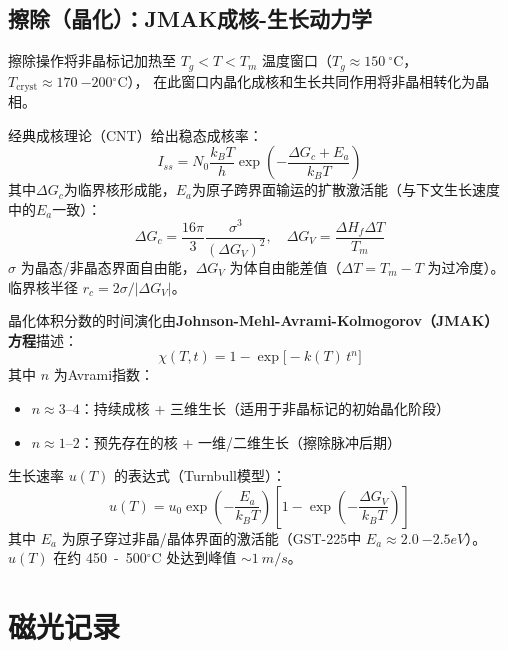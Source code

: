 \documentclass[11pt,a4paper,twoside]{article}
\newcommand{\degC}{\ensuremath{{}^{\circ}\mathrm{C}}}
\theoremstyle{definition}\newtheorem{definition}{定义}[section]
\theoremstyle{plain}\newtheorem{theorem}{定理}[section]
\theoremstyle{remark}\newtheorem{remark}{注解}[section]
\begin{document}
\subsection{擦除（晶化）：JMAK成核-生长动力学}

擦除操作将非晶标记加热至 $T_g < T < T_m$ 温度窗口（$T_g \approx \SI{150}{\degC{}}$，
$T_{\text{cryst}} \approx \SI{170}{-200}{\degC{}}$），
在此窗口内晶化成核和生长共同作用将非晶相转化为晶相。

经典成核理论（CNT）给出稳态成核率：
\begin{equation}\label{eq:nucleation}
  I_{ss} = N_0 \frac{k_B T}{h}
          \exp\!\left( -\frac{\Delta G_c + E_a}{k_B T} \right)
\end{equation}
其中$\Delta G_c$为临界核形成能，$E_a$为原子跨界面输运的扩散激活能（与下文生长速度中的$E_a$一致）：
\begin{equation}
  \Delta G_c = \frac{16\pi}{3} \frac{\sigma^3}{(\Delta G_V)^2},
  \quad \Delta G_V = \frac{\Delta H_f \Delta T}{T_m}
\end{equation}
$\sigma$ 为晶态/非晶态界面自由能，$\Delta G_V$ 为体自由能差值（$\Delta T = T_m - T$
为过冷度）。临界核半径 $r_c = 2\sigma/|\Delta G_V|$。

晶化体积分数的时间演化由\textbf{Johnson-Mehl-Avrami-Kolmogorov（JMAK）方程}描述：
\begin{equation}\label{eq:jmak}
  \boxed{ \chi(T, t) = 1 - \exp\!\big[ -k(T)\, t^n \big] }
\end{equation}
其中 $n$ 为Avrami指数：
\begin{itemize}
  \item $n\approx 3$--$4$：持续成核 + 三维生长（适用于非晶标记的初始晶化阶段）
  \item $n\approx 1$--$2$：预先存在的核 + 一维/二维生长（擦除脉冲后期）
\end{itemize}

生长速率 $u(T)$ 的表达式（Turnbull模型）：
\begin{equation}\label{eq:growth-rate}
  u(T) = u_0 \exp\!\left( -\frac{E_a}{k_B T} \right)
        \left[ 1 - \exp\!\left( -\frac{\Delta G_V}{k_B T} \right) \right]
\end{equation}
其中 $E_a$ 为原子穿过非晶/晶体界面的激活能（GST-225中 $E_a \approx \SI{2.0}{-2.5}{eV}$）。
$u(T)$ 在约 \SI{450}{-500}{\degC{}} 处达到峰值 $\sim \SI{1}{m/s}$。

\section{磁光记录}
\end{document}
